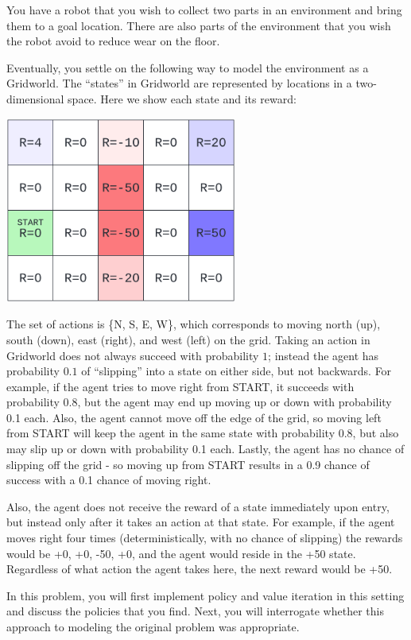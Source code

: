 \documentclass[submit]{harvardml}
\begin{document}
\begin{problem}

You have a robot that you wish to collect two parts in an environment
and bring them to a goal location.  There are also parts of the
environment that you wish the robot avoid to reduce wear on the floor.

Eventually, you settle on the following way to model the environment
as a Gridworld.  The ``states'' in Gridworld are represented by
locations in a two-dimensional space.  Here we show each state and its
reward:

\begin{center}
\includegraphics[width=3in]{images/gridworld.png}
\end{center}

The set of actions is \{N, S, E, W\}, which corresponds to moving north (up), south (down), east (right), and west (left) on the grid. Taking an action in Gridworld does not always succeed with probability
$1$; instead the agent has probability $0.1$ of ``slipping'' into a
state on either side, but not backwards.  For example, if the agent tries to move right from START, it succeeds with probability 0.8, but the agent may end up moving up or down with probability 0.1 each. Also, the agent cannot move off the edge of the grid, so moving left from START will keep the agent in the same state with probability 0.8, but also may slip up or down with probability 0.1 each. Lastly, the agent has no chance of slipping off the grid - so moving up from START results in a 0.9 chance of success with a 0.1 chance of moving right.

Also, the agent does not receive the reward of a state immediately upon entry, but instead only after it takes an action at that state. For example, if the agent moves right four times (deterministically, with no chance of slipping) the rewards would be +0, +0, -50, +0, and the agent would reside in the +50 state. Regardless of what action the agent takes here, the next reward would be +50.

In this problem, you will first implement policy and value iteration in this setting and discuss the policies that you find.  Next, you will interrogate whether this approach to modeling the original problem was appropriate.

\end{problem}
\newpage
\end{document}
